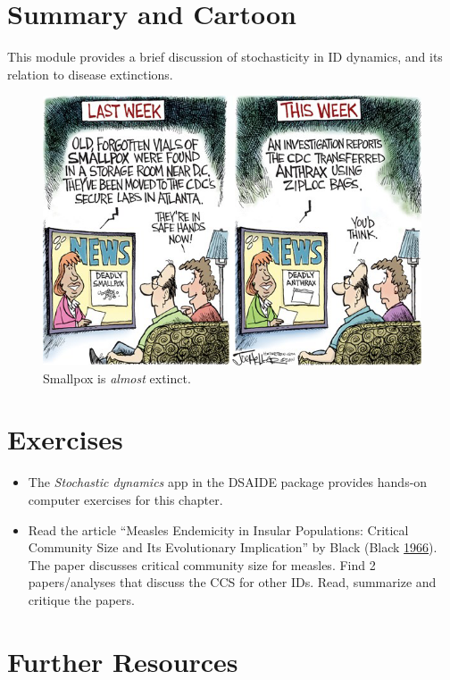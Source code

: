 \documentclass[]{book}
\providecommand{\tightlist}{%
  \setlength{\itemsep}{0pt}\setlength{\parskip}{0pt}}
\theoremstyle{definition}
\theoremstyle{definition}
\theoremstyle{definition}
\theoremstyle{remark}
\begin{document}
\hypertarget{summary-and-cartoon-3}{%
\section{Summary and Cartoon}\label{summary-and-cartoon-3}}

This module provides a brief discussion of stochasticity in ID dynamics,
and its relation to disease extinctions.

\begin{figure}
\centering
\includegraphics{./images/smallpox.png}
\caption{\label{fig:smallpox}Smallpox is \emph{almost} extinct.}
\end{figure}

\hypertarget{exercises-1}{%
\section{Exercises}\label{exercises-1}}

\begin{itemize}
\tightlist
\item
  The \emph{Stochastic dynamics} app in the DSAIDE package provides
  hands-on computer exercises for this chapter.
\item
  Read the article ``Measles Endemicity in Insular Populations: Critical
  Community Size and Its Evolutionary Implication'' by Black (Black
  \protect\hyperlink{ref-black66}{1966}). The paper discusses critical
  community size for measles. Find 2 papers/analyses that discuss the
  CCS for other IDs. Read, summarize and critique the papers.
\end{itemize}

\hypertarget{further-resources-6}{%
\section{Further Resources}\label{further-resources-6}}
\end{document}
